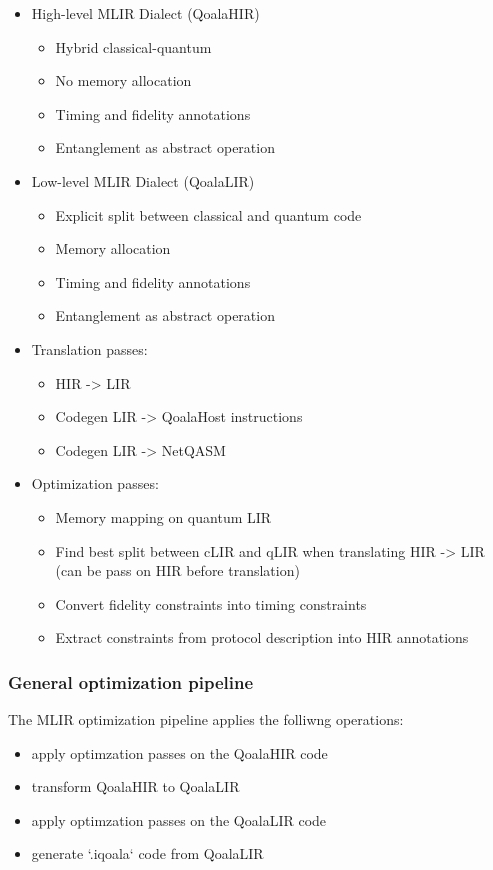 \begin{itemize}
\item High-level MLIR Dialect (QoalaHIR)
    \begin{itemize}
        \item Hybrid classical-quantum
        \item No memory allocation
        \item Timing and fidelity annotations
        \item Entanglement as abstract operation
    \end{itemize}
\item Low-level MLIR Dialect (QoalaLIR)
    \begin{itemize}
        \item Explicit split between classical and quantum code
        \item Memory allocation
        \item Timing and fidelity annotations
        \item Entanglement as abstract operation
    \end{itemize}
\item Translation passes:
    \begin{itemize}
        \item HIR -> LIR
        \item Codegen LIR -> QoalaHost instructions
        \item Codegen LIR -> NetQASM
    \end{itemize}
\item Optimization passes:
    \begin{itemize}
        \item Memory mapping on quantum LIR
        \item Find best split between cLIR and qLIR when translating HIR -> LIR (can be pass on HIR before translation)
        \item Convert fidelity constraints into timing constraints
        \item Extract constraints from protocol description into HIR annotations
    \end{itemize}
\end{itemize}


\subsubsection{General optimization pipeline}
The MLIR optimization pipeline applies the folliwng operations:
\begin{itemize}
\item apply optimzation passes on the QoalaHIR code
\item transform QoalaHIR to QoalaLIR
\item apply optimzation passes on the QoalaLIR code
\item generate `.iqoala` code from QoalaLIR
\end{itemize}

